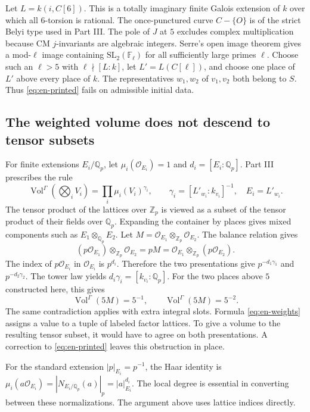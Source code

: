 \documentclass[UTF8,fontset=none,zihao=-4,a4paper]{ctexart}
\newcommand{\OO}{\mathcal O}
\newcommand{\Q}{\mathbb Q}
\newcommand{\Z}{\mathbb Z}
\newcommand{\Vol}{\operatorname{Vol}}
\begin{document}
Let \(L=k(i,C[6])\). This is a totally imaginary finite Galois extension of \(k\) over which all \(6\)-torsion is rational. The once-punctured curve \(C-\{O\}\) is of the strict Belyi type used in Part III. The pole of \(J\) at \(5\) excludes complex multiplication because CM \(j\)-invariants are algebraic integers. Serre's open image theorem gives a mod-\(\ell\) image containing \(\mathrm{SL}_2(\mathbb F_\ell)\) for all sufficiently large primes \(\ell\). Choose such an \(\ell>5\) with \(\ell\nmid[L:k]\), let \(L'=L(C[\ell])\), and choose one place of \(L'\) above every place of \(k\). The representatives \(w_1,w_2\) of \(v_1,v_2\) both belong to \(S\). Thus \eqref{eq:en-printed} fails on admissible initial data.\cite{jii,jiii,serre}

\subsection{The weighted volume does not descend to tensor subsets}
For finite extensions \(E_i/\Q_p\), let \(\mu_i(\OO_{E_i})=1\) and \(d_i=[E_i:\Q_p]\). Part III prescribes the rule
\begin{equation}
 \Vol^\Gamma\left(\bigotimes_i V_i\right)=\prod_i\mu_i(V_i)^{\gamma_i},
 \qquad \gamma_i=[L'_{w_i}:k_{v_i}]^{-1},\quad E_i=L'_{w_i}.
 \label{eq:en-weights}
\end{equation}
The tensor product of the lattices over \(\Z_p\) is viewed as a subset of the tensor product of their fields over \(\Q_p\). Expanding the container by places gives mixed components such as \(E_1\otimes_{\Q_p}E_2\). Let \(M=\OO_{E_1}\otimes_{\Z_p}\OO_{E_2}\). The balance relation gives
\[
 (p\OO_{E_1})\otimes_{\Z_p}\OO_{E_2}=pM
 =\OO_{E_1}\otimes_{\Z_p}(p\OO_{E_2}).
\]
The index of \(p\OO_{E_i}\) in \(\OO_{E_i}\) is \(p^{d_i}\). Therefore the two presentations give \(p^{-d_1\gamma_1}\) and \(p^{-d_2\gamma_2}\). The tower law yields \(d_i\gamma_i=[k_{v_i}:\Q_p]\). For the two places above \(5\) constructed here, this gives
\[
 \Vol^\Gamma(5M)=5^{-1},\qquad \Vol^\Gamma(5M)=5^{-2}.
\]
The same contradiction applies with extra integral slots. Formula \eqref{eq:en-weights} assigns a value to a tuple of labeled factor lattices. To give a volume to the resulting tensor subset, it would have to agree on both presentations. A correction to \eqref{eq:en-printed} leaves this obstruction in place.\cite[Weighted volume and Form 2]{jiii}

For the standard extension \(|p|_{E_i}=p^{-1}\), the Haar identity is \(\mu_i(a\OO_{E_i})=|N_{E_i/\Q_p}(a)|_p=|a|_{E_i}^{d_i}\). The local degree is essential in converting between these normalizations. The argument above uses lattice indices directly.
\end{document}

